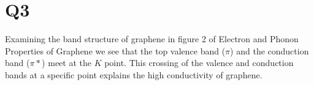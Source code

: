 \documentclass[a4paper,11pt]{article}
\numberwithin{equation}{section}
\begin{document}
\section*{Q3}
Examining the band structure of graphene in figure 2 of Electron and Phonon Properties of Graphene we see that the top valence band ($\pi $) and the conduction band ($\pi*$) meet at the $K$ point.
This crossing of the valence and conduction bands at a specific point explains the high conductivity of graphene.
\end{document}
